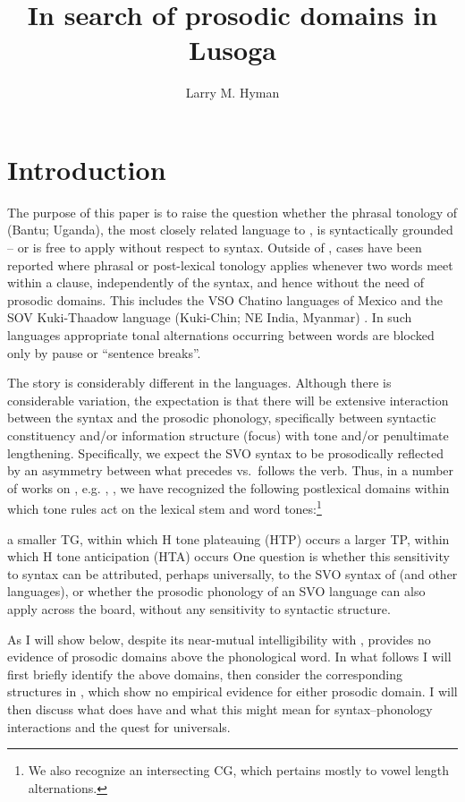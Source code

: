 \documentclass[output=paper]{langsci/langscibook}
\author{Larry M. Hyman\affiliation{University of California, Berkeley}}
\title{In search of prosodic domains in Lusoga}
\begin{document}
\glsresetall

\section{Introduction}\label{sec:13.1}\largerpage

The purpose of this paper is to raise the question whether the phrasal tonology
of  (Bantu; Uganda), the most closely related language to , is
syntactically grounded -- or is free to apply without respect to syntax. Outside
of , cases have been reported where phrasal or post-lexical tonology
applies whenever two words meet within a clause, independently of the syntax,
and hence without the need of prosodic domains. This
includes the VSO Chatino languages of Mexico
\parencite{Cruz2011,Campbell2014,McIntosh2015,Sullivant2015,Villard2015} and
the SOV Kuki-Thaadow language (Kuki-Chin; NE India, Myanmar) \citep{Hyman2010}.
In such languages appropriate tonal alternations occurring between words are
blocked only by pause or “sentence breaks”.

The story is considerably different in the  languages. Although there is
considerable variation, the expectation is that there will be extensive
interaction between the syntax and the prosodic phonology, specifically between
syntactic constituency and/or information structure (focus) with tone and/or
penultimate lengthening. Specifically, we expect the SVO syntax to be
prosodically reflected by an asymmetry between what precedes vs.\ follows the
verb. Thus, in a number of works on , e.g.
\citet{HymanKatambaWalusimbi1987}, \citet{HymanKatamba2010}, we have recognized
the following postlexical domains within which tone rules act on the lexical
stem and word tones:\footnote{We also recognize an intersecting \gls{CG}, which
pertains mostly to vowel length alternations.}

\ea\label{ex:13.1}
    \ea a smaller \gls{TG}, within which H tone plateauing (\gls{HTP}) occurs
    \ex a larger \gls{TP}, within which H tone anticipation (\gls{HTA}) occurs
    \z
\z
One question is whether this sensitivity to syntax can be attributed, perhaps
universally, to the SVO syntax of  (and other  languages), or
whether the prosodic phonology of an SVO language can also apply across the
board, without any sensitivity to syntactic structure.

As I will show below, despite its near-mutual intelligibility with ,
 provides no evidence of prosodic domains above the phonological word.
In what follows I will first briefly identify the above  domains, then
consider the corresponding structures in , which show no empirical
evidence for either prosodic domain. I will then discuss what  does have
and what this might mean for syntax--phonology interactions and the quest for
universals.
\end{document}
